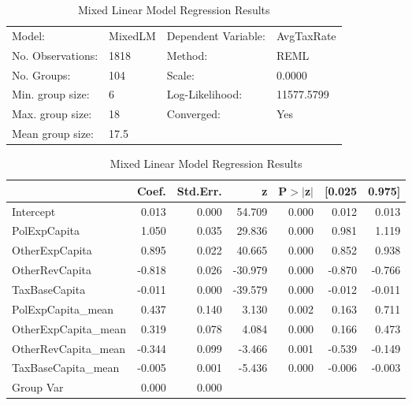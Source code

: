 \begin{table}
\caption{Mixed Linear Model Regression Results}
\label{}
\begin{center}
\begin{tabular}{llll}
\hline
Model:            & MixedLM & Dependent Variable: & AvgTaxRate  \\
No. Observations: & 1818    & Method:             & REML        \\
No. Groups:       & 104     & Scale:              & 0.0000      \\
Min. group size:  & 6       & Log-Likelihood:     & 11577.5799  \\
Max. group size:  & 18      & Converged:          & Yes         \\
Mean group size:  & 17.5    &                     &             \\
\hline
\end{tabular}
\end{center}

\begin{center}
\begin{tabular}{lrrrrrr}
\hline
                     &  Coef. & Std.Err. &       z & P$> |$z$|$ & [0.025 & 0.975]  \\
\hline
Intercept            &  0.013 &    0.000 &  54.709 &       0.000 &  0.012 &  0.013  \\
PolExpCapita         &  1.050 &    0.035 &  29.836 &       0.000 &  0.981 &  1.119  \\
OtherExpCapita       &  0.895 &    0.022 &  40.665 &       0.000 &  0.852 &  0.938  \\
OtherRevCapita       & -0.818 &    0.026 & -30.979 &       0.000 & -0.870 & -0.766  \\
TaxBaseCapita        & -0.011 &    0.000 & -39.579 &       0.000 & -0.012 & -0.011  \\
PolExpCapita\_mean   &  0.437 &    0.140 &   3.130 &       0.002 &  0.163 &  0.711  \\
OtherExpCapita\_mean &  0.319 &    0.078 &   4.084 &       0.000 &  0.166 &  0.473  \\
OtherRevCapita\_mean & -0.344 &    0.099 &  -3.466 &       0.001 & -0.539 & -0.149  \\
TaxBaseCapita\_mean  & -0.005 &    0.001 &  -5.436 &       0.000 & -0.006 & -0.003  \\
Group Var            &  0.000 &    0.000 &         &             &        &         \\
\hline
\end{tabular}
\end{center}
\end{table}
\bigskip
